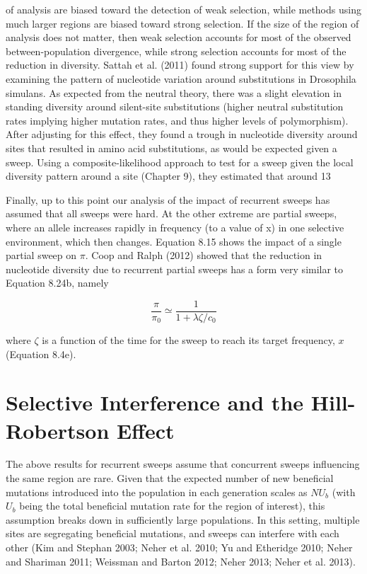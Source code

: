 \documentclass{article}
\begin{document}
of analysis are biased toward the detection of weak selection, while methods using much larger regions are biased toward strong selection. If the size of the region of analysis does not matter, then weak selection accounts for most of the observed between-population divergence, while strong selection accounts for most of the reduction in diversity. Sattah et al. (2011) found strong support for this view by examining the pattern of nucleotide variation around substitutions in Drosophila simulans. As expected from the neutral theory, there was a slight elevation in standing diversity around silent-site substitutions (higher neutral substitution rates implying higher mutation rates, and thus higher levels of polymorphism). After adjusting for this effect, they found a trough in nucleotide diversity around sites that resulted in amino acid substitutions, as would be expected given a sweep. Using a composite-likelihood approach to test for a sweep given the local diversity pattern around a site (Chapter 9), they estimated that around 13%

Finally, up to this point our analysis of the impact of recurrent sweeps has assumed that all sweeps were hard. At the other extreme are partial sweeps, where an allele increases rapidly in frequency (to a value of x) in one selective environment, which then changes. Equation 8.15 shows the impact of a single partial sweep on  $ \pi $. Coop and Ralph (2012) showed that the reduction in nucleotide diversity due to recurrent partial sweeps has a form very similar to Equation 8.24b, namely

\begin{equation}
\frac{\pi}{\pi_{0}}\simeq\frac{1}{1+\lambda\zeta/c_{0}}
\tag{8.26}
\label{eq:8_26}
\end{equation}

where  $ \zeta $ is a function of the time for the sweep to reach its target frequency,  $ x $ (Equation 8.4e).

\section{Selective Interference and the Hill-Robertson Effect}
The above results for recurrent sweeps assume that concurrent sweeps influencing the same region are rare. Given that the expected number of new beneficial mutations introduced into the population in each generation scales as  $ NU_b $ (with  $ U_b $ being the total beneficial mutation rate for the region of interest), this assumption breaks down in sufficiently large populations. In this setting, multiple sites are segregating beneficial mutations, and sweeps can interfere with each other (Kim and Stephan 2003; Neher et al. 2010; Yu and Etheridge 2010; Neher and Shariman 2011; Weissman and Barton 2012; Neher 2013; Neher et al. 2013).
\end{document}
